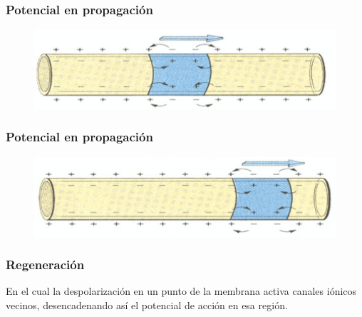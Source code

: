 \documentclass[14pt]{beamer}
\begin{document}
\begin{frame}
\frametitle{Potencial en propagación}
\begin{figure}
    \centering
    \includegraphics[scale=0.7]{Imagenes/Potencial_Accion_09b.png}
\end{figure}
\end{frame}
\begin{frame}
\frametitle{Potencial en propagación}
\begin{figure}
    \centering
    \includegraphics[scale=0.7]{Imagenes/Potencial_Accion_09c.png}
\end{figure}
\end{frame}
\begin{frame}
\frametitle{Regeneración}
En el cual la despolarización en un punto de la membrana activa canales iónicos vecinos, \pause desencadenando así el potencial de acción en esa región.
\end{frame}
\end{document}
